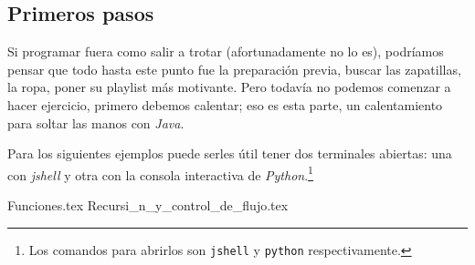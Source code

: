 \subsection{Primeros pasos}
  Si programar fuera como salir a trotar (afortunadamente no lo es), podríamos pensar que todo hasta
  este punto fue la preparación previa, buscar las zapatillas, la ropa, poner su playlist más 
  motivante.
  Pero todavía no podemos comenzar a hacer ejercicio, primero debemos calentar; eso es esta parte, 
  un calentamiento para soltar las manos con \textit{Java}.

  Para los siguientes ejemplos puede serles útil tener dos terminales abiertas: una con 
  \textit{jshell} y otra con la consola interactiva de \textit{Python}.\footnote{Los comandos para 
  abrirlos son \texttt{jshell} y \texttt{python} respectivamente.}

  {Funciones.tex}
  {Recursi_n_y_control_de_flujo.tex}

